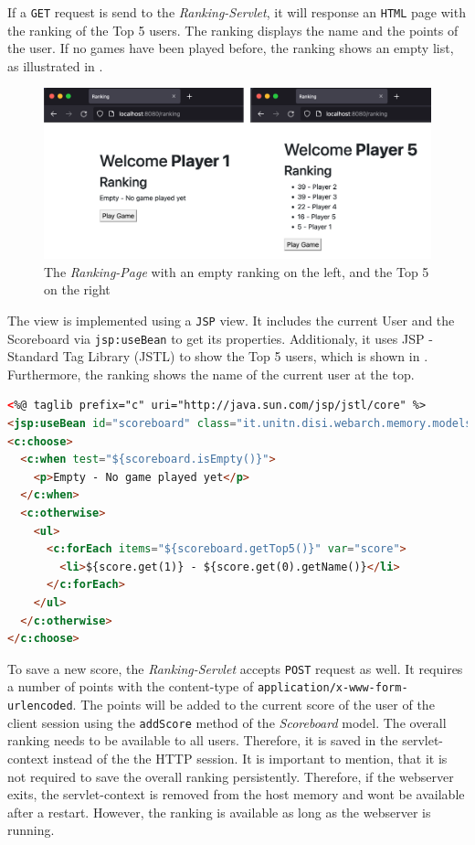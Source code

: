 If a \texttt{GET} request is send to the \textit{Ranking-Servlet}, it will response an \texttt{HTML} page with the ranking of the Top 5 users. The ranking displays the name and the points of the user. If no games have been played before, the ranking shows an empty list, as illustrated in .
\begin{figure}[h]
\centering
\includegraphics[scale=0.2]{images/03_impl/ranking/ranking}
\caption{The \textit{Ranking-Page} with an empty ranking on the left, and the Top 5 on the right}
\label{fig:03_impl_backend_ranking_page}
\end{figure}

The view is implemented using a \texttt{JSP} view. It includes the current User and the Scoreboard via \texttt{jsp:useBean} to get its properties.
Additionaly, it uses JSP - Standard Tag Library (JSTL) to show the Top 5 users, which is shown in . Furthermore, the ranking shows the name of the current user at the top.
\begin{lstlisting}[label=lst:03_impl_backend_ranking_jstl, caption=Show the Top 5 using JSTL, language=html]
<%@ taglib prefix="c" uri="http://java.sun.com/jsp/jstl/core" %>
<jsp:useBean id="scoreboard" class="it.unitn.disi.webarch.memory.models.Scoreboard" scope="application"/>
<c:choose>
  <c:when test="${scoreboard.isEmpty()}">
    <p>Empty - No game played yet</p>
  </c:when>
  <c:otherwise>
    <ul>
      <c:forEach items="${scoreboard.getTop5()}" var="score">
        <li>${score.get(1)} - ${score.get(0).getName()}</li>
      </c:forEach>
    </ul>
  </c:otherwise>
</c:choose>
\end{lstlisting}


To save a new score, the \textit{Ranking-Servlet} accepts \texttt{POST} request as well. It requires a number of points with the content-type of \texttt{application/x-www-form-urlencoded}.
The points will be added to the current score of the user of the client session using the \texttt{addScore} method of the \textit{Scoreboard} model.
The overall ranking needs to be available to all users. Therefore, it is saved in the servlet-context instead of the the HTTP session.
It is important to mention, that it is not required to save the overall ranking persistently. Therefore, if the webserver exits, the servlet-context is removed from the host memory and wont be available after a restart. However, the ranking is available as long as the webserver is running.

